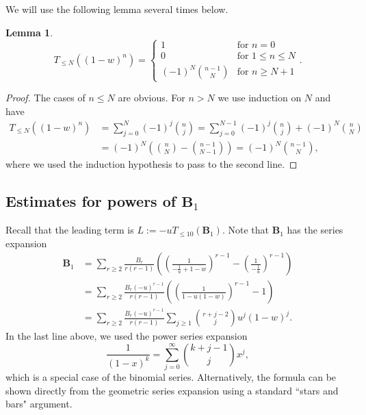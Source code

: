 \documentclass[12pt]{amsart}
\newtheorem{lem}[thm]{Lemma}
\theoremstyle{definition}
\numberwithin{equation}{section}
\newcommand{\bB}{\mathbf{B}}
\theoremstyle{definition} %
\theoremstyle{remark}
\begin{document}
We will use the following lemma several times below.
\begin{lem}\label{lem:T 1-w}
    \[
        T_{\leq N} \left( (1-w)^n\right) =
        \begin{cases}
        1 & \text{for $n=0$} \\
        0 & \text{for $1\leq n\leq N$} \\
        (-1)^N \binom{n-1}{N} & \text{for $n\geq N+1$}
        \end{cases}.
    \]
    \end{lem}
    \begin{proof}
    The cases of $n\leq N$ are obvious. For $n>N$ we use induction on $N$ and have
    \begin{align*}
        T_{\leq N} \left( (1-w)^n\right) 
        &= 
        \sum_{j=0}^N 
        (-1)^j
        \binom{n}{j} 
        =\sum_{j=0}^{N-1}
        (-1)^j
        \binom{n}{j}
        +
        (-1)^N
        \binom{n}{N}
        \\&= 
        (-1)^N \left( \binom{n}{N} -\binom{n-1}{N-1} \right)
        =
         (-1)^N  \binom{n-1}{N} ,
    \end{align*}
    where we used the induction hypothesis to pass to the second line.
    \end{proof}



\subsection{Estimates for powers of \texorpdfstring{$\bB_1$}{bb1}}
\label{sec:l1terms}
Recall that the leading term is $L := -u T_{\leq 10}(\bB_1)$.
Note that $\bB_1$ has the series expansion 
\begin{align*}
    \bB_1&= 
    \sum_{r\geq 2} \frac{B_r}{r(r-1)} \left(\left(\frac{1}{-\frac{1}{u}+1-w}\right)^{r-1}- \left(\frac{1}{-\frac{1}{u}}\right)^{r-1}\right)
    \\&=
    \sum_{r\geq 2} \frac{B_r (-u)^{r-1} }{r(r-1)}
    \left(\left(\frac{1}{1-u(1-w)}\right)^{r-1}- 1\right)
    \\&=
    \sum_{r\geq 2} \frac{B_r (-u)^{r-1} }{r(r-1)}
    \sum_{j\geq 1} \binom{r+j-2}{j} u^j (1-w)^j.
\end{align*}
In the last line above, we used the power series expansion
\[
\frac 1{(1-x)^k} = \sum_{j=0}^\infty  \binom{k+j-1}{j} x^j,
\]
which is a special case of the binomial series.
Alternatively, the formula can be shown directly from the geometric series expansion using a standard ``stars and bars" argument.
\end{document}
